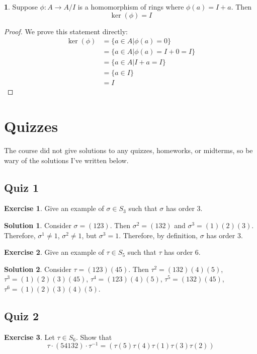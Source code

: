 \documentclass[12pt]{article}
\theoremstyle{definition}
\newtheorem{theorem}{\color{ForestGreen}{\textbf{Theorem}}}
\newtheorem{exercise}{\color{YellowOrange}Exercise}
\theoremstyle{definition}
\newtheorem{solution}{\color{Goldenrod}Solution}
\begin{document}
\begin{theorem}
	Suppose $\phi : A \to A/I$ is a homomorphism of rings where $\phi(a) = I + a$. Then 
	\begin{equation}
		\ker(\phi) = I
	\end{equation}
\end{theorem}
\begin{proof}
	We prove this statement directly:
	\begin{align*}
		\ker(\phi) &= \{ a \in A | \phi(a) = 0\} \\ 
		&= \{ a \in A | \phi(a) = I + 0 = I\} \tag{$I$ is the trivial element of the quotient}\\
		&= \{ a \in A | I + a = I \} \\
		&= \{ a \in I \} \\
		&= I
	\end{align*}
\end{proof}

\section{Quizzes}
The course did not give solutions to any quizzes, homeworks, or midterms, so be wary of the solutions I've written below. 

\subsection{Quiz 1}

\begin{exercise}
Give an example of $\sigma \in S_3$ such that $\sigma$ has order 3. 
\end{exercise}
\begin{solution}
Consider $\sigma = (1 2 3)$. Then $\sigma^2 = (1 3 2)$ and $\sigma^3 = (1)(2)(3)$. Therefore, $\sigma^1 \neq 1$, $\sigma^2 \neq 1$, but $\sigma^3 = 1$. Therefore, by definition, $\sigma$ has order $3$.
\end{solution}

\begin{exercise}
Give an example of $\tau \in S_5$ such that $\tau$ has order 6. 
\end{exercise}
\begin{solution}
Consider $\tau = (123)(45)$. Then $\tau^2 = (132)(4)(5)$, $\tau^3 = (1)(2)(3)(45)$, $\tau^4 = (123)(4)(5)$, $\tau^5 = (132)(45)$, $\tau^6 = (1)(2)(3)(4)(5)$.
\end{solution}

\subsection{Quiz 2}
\begin{exercise}
Let $\tau \in S_6$. Show that
\begin{equation*}
\tau \cdot (5 4 1 3 2) \cdot \tau^{-1} = (\tau(5) \tau(4) \tau(1) \tau(3) \tau(2))
\end{equation*}
\end{exercise}
\end{document}
